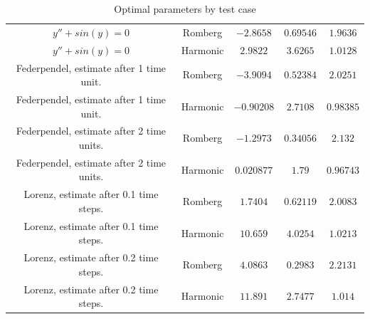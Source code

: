 \begin{table}[H]
\begin{tabular}{c|c||c|c|c}
$y'' + sin(y) = 0$ & Romberg & \(-2.8658\) & \(0.69546\) & \(1.9636\) \\
$y'' + sin(y) = 0$ & Harmonic & \(2.9822\) & \(3.6265\) & \(1.0128\) \\
Federpendel, estimate after 1 time unit. & Romberg & \(-3.9094\) & \(0.52384\) & \(2.0251\) \\
Federpendel, estimate after 1 time unit. & Harmonic & \(-0.90208\) & \(2.7108\) & \(0.98385\)\\
Federpendel, estimate after 2 time units. & Romberg & \(-1.2973\) & \(0.34056\) & \(2.132\)\\
Federpendel, estimate after 2 time units. & Harmonic & \(0.020877\) & \(1.79\) & \(0.96743\)\\
Lorenz, estimate after 0.1 time steps. & Romberg & \(1.7404\) & \(0.62119\) & \(2.0083\)\\
Lorenz, estimate after 0.1 time steps. & Harmonic & \(10.659\) & \(4.0254\) & \(1.0213\) \\
Lorenz, estimate after 0.2 time steps. & Romberg & \(4.0863\) & \(0.2983\) & \(2.2131\)  \\
Lorenz, estimate after 0.2 time steps. & Harmonic & \(11.891\) & \(2.7477\) & \(1.014\)\\
    \end{tabular}
    \caption{Optimal parameters by test case}
    \label{tab:my_label}
\end{table}